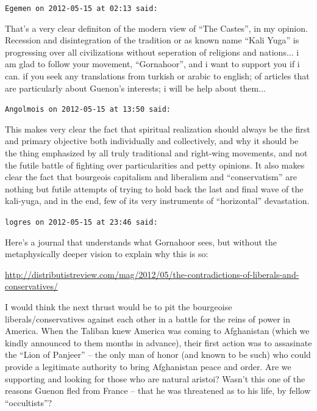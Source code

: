 \begin{footnotesize}
\begin{sffamily}
\texttt{Egemen on 2012-05-15 at 02:13 said:}

That's a very clear definiton of the modern view of ``The Castes'', in my opinion. Recession and disintegration of the tradition or as known name ``Kali Yuga'' is progressing over all civilizations without seperation of religions and nations... i am glad to follow your movement, ``Gornahoor'', and i want to support you if i can. if you seek any translations from turkish or arabic to english; of articles that are particularly about Guenon's interests; i will be help about them... 

\hfill

\texttt{Angolmois on 2012-05-15 at 13:50 said:}

This makes very clear the fact that spiritual realization should always be the first and primary objective both individually and collectively, and why it should be the thing emphasized by all truly traditional and right-wing movements, and not the futile battle of fighting over particularities and petty opinions. It also makes clear the fact that bourgeois capitalism and liberalism and ``conservatism'' are nothing but futile attempts of trying to hold back the last and final wave of the kali-yuga, and in the end, few of its very instruments of ``horizontal'' devastation.

\hfill

\texttt{logres on 2012-05-15 at 23:46 said:}

Here's a journal that understands what Gornahoor sees, but without the metaphysically deeper vision to explain why this is so:

\url{http://distributistreview.com/mag/2012/05/the-contradictions-of-liberals-and-conservatives/}

I would think the next thrust would be to pit the bourgeoise liberals/conservatives against each other in a battle for the reins of power in America. When the Taliban knew America was coming to Afghanistan (which we kindly announced to them months in advance), their first action was to assasinate the ``Lion of Panjeer'' -- the only man of honor (and known to be such) who could provide a legitimate authority to bring Afghanistan peace and order. Are we supporting and looking for those who are natural aristoi? Wasn't this one of the reasons Guenon fled from France -- that he was threatened as to his life, by fellow ``occultists''?


\end{sffamily}
\end{footnotesize}
